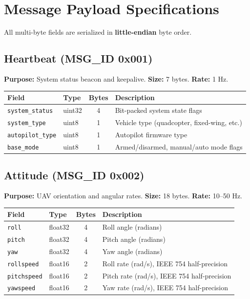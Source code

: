 \documentclass[11pt,a4paper]{article}
\begin{document}
\section{Message Payload Specifications}
\label{sec:messages}

All multi-byte fields are serialized in \textbf{little-endian} byte order.

\subsection{Heartbeat (MSG\_ID 0x001)}

\textbf{Purpose:} System status beacon and keepalive. \textbf{Size:} 7 bytes. \textbf{Rate:} 1 Hz.

\begin{table}[H]
\centering
\begin{tabular}{@{}llcl@{}}
\toprule
\textbf{Field} & \textbf{Type} & \textbf{Bytes} & \textbf{Description} \\
\midrule
\texttt{system\_status}  & uint32 & 4 & Bit-packed system state flags \\
\texttt{system\_type}    & uint8  & 1 & Vehicle type (quadcopter, fixed-wing, etc.) \\
\texttt{autopilot\_type} & uint8  & 1 & Autopilot firmware type \\
\texttt{base\_mode}      & uint8  & 1 & Armed/disarmed, manual/auto mode flags \\
\bottomrule
\end{tabular}
\end{table}

\subsection{Attitude (MSG\_ID 0x002)}

\textbf{Purpose:} UAV orientation and angular rates. \textbf{Size:} 18 bytes. \textbf{Rate:} 10--50 Hz.

\begin{table}[H]
\centering
\begin{tabular}{@{}llcl@{}}
\toprule
\textbf{Field} & \textbf{Type} & \textbf{Bytes} & \textbf{Description} \\
\midrule
\texttt{roll}       & float32 & 4 & Roll angle (radians) \\
\texttt{pitch}      & float32 & 4 & Pitch angle (radians) \\
\texttt{yaw}        & float32 & 4 & Yaw angle (radians) \\
\texttt{rollspeed}  & float16 & 2 & Roll rate (rad/s), IEEE 754 half-precision \\
\texttt{pitchspeed} & float16 & 2 & Pitch rate (rad/s), IEEE 754 half-precision \\
\texttt{yawspeed}   & float16 & 2 & Yaw rate (rad/s), IEEE 754 half-precision \\
\bottomrule
\end{tabular}
\end{table}
\end{document}
